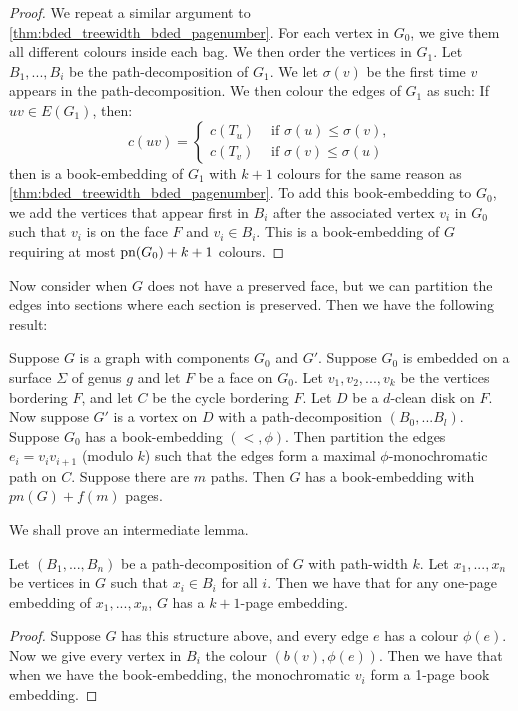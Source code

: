 \begin{proof}
	We repeat a similar argument to \cref{thm:bded_treewidth_bded_pagenumber}. For each vertex in $G_0$, we give them all different colours inside each bag. We then order the vertices in $G_1$. Let $B_1, ..., B_i$ be the path-decomposition of $G_1$. We let $\sigma(v)$ be the first time $v$ appears in the path-decomposition. We then colour the edges of $G_1$ as such: If $uv \in E(G_1)$, then:
	\begin{equation}
		c(uv) = 
		\begin{cases}
			c(T_u) &\text{ if } \sigma(u) \leq \sigma(v),\\
			c(T_v) &\text{ if } \sigma(v) \leq \sigma(u)
		\end{cases}
	\end{equation}
	then is a book-embedding of $G_1$ with $k+1$ colours for the same reason as \cref{thm:bded_treewidth_bded_pagenumber}.
	To add this book-embedding to $G_0$, we add the vertices that appear first in $B_i$ after the associated vertex $v_i$ in $G_0$ such that $v_i$ is on the face $F$ and $v_i \in B_i$. This is a book-embedding of $G$ requiring at most $\text{pn}(G_0) + k + 1$ colours. 
\end{proof}

Now consider when $G$ does not have a preserved face, but we can partition the edges into sections where each section is preserved. Then we have the following result:
\begin{lemma}
	Suppose $G$ is a graph with components $G_0$ and $G'$. Suppose $G_0$ is embedded on a surface $\Sigma$ of genus $g$ and let $F$ be a face on $G_0$. Let $v_1, v_2, ..., v_k$ be the vertices bordering $F$, and let $C$ be the cycle bordering $F$. Let $D$ be a $d$-clean disk on $F$. Now suppose $G'$ is a vortex on $D$ with a path-decomposition $(B_0, ... B_l)$. Suppose $G_0$ has a book-embedding $(<, \phi)$. Then partition the edges $e_i = v_i v_{i + 1}$ (modulo $k$) such that the edges form a maximal $\phi$-monochromatic path on $C$. Suppose there are $m$ paths. Then $G$ has a book-embedding with $pn(G) + f(m)$ pages.
\end{lemma}
We shall prove an intermediate lemma. 
\begin{lemma}
	Let $(B_1, ..., B_n)$ be a path-decomposition of $G$ with path-width $k$. Let $x_1, ..., x_n$ be vertices in $G$ such that $x_i \in B_i$ for all $i$. Then we have that for any one-page embedding of $x_1, ..., x_n$, $G$ has a $k + 1$-page embedding. 
\end{lemma}
\begin{proof}
	Suppose $G$ has this structure above, and every edge $e$ has a colour $\phi(e)$. 
	Now we give every vertex in $B_i$ the colour $(b(v),  \phi(e))$. Then we have that when we have the book-embedding, the monochromatic $v_i$ form a 1-page book embedding.
\end{proof}

